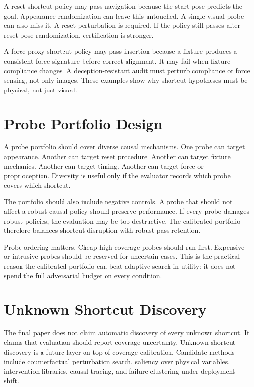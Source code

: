 \documentclass{article}
\begin{document}
A reset shortcut policy may pass navigation because the start pose predicts the goal. Appearance randomization can leave this untouched. A single visual probe can also miss it. A reset perturbation is required. If the policy still passes after reset pose randomization, certification is stronger.

A force-proxy shortcut policy may pass insertion because a fixture produces a consistent force signature before correct alignment. It may fail when fixture compliance changes. A deception-resistant audit must perturb compliance or force sensing, not only images. These examples show why shortcut hypotheses must be physical, not just visual.

\clearpage
\section{Probe Portfolio Design}

A probe portfolio should cover diverse causal mechanisms. One probe can target appearance. Another can target reset procedure. Another can target fixture mechanics. Another can target timing. Another can target force or proprioception. Diversity is useful only if the evaluator records which probe covers which shortcut.

The portfolio should also include negative controls. A probe that should not affect a robust causal policy should preserve performance. If every probe damages robust policies, the evaluation may be too destructive. The calibrated portfolio therefore balances shortcut disruption with robust pass retention.

Probe ordering matters. Cheap high-coverage probes should run first. Expensive or intrusive probes should be reserved for uncertain cases. This is the practical reason the calibrated portfolio can beat adaptive search in utility: it does not spend the full adversarial budget on every condition.

\clearpage
\section{Unknown Shortcut Discovery}

The final paper does not claim automatic discovery of every unknown shortcut. It claims that evaluation should report coverage uncertainty. Unknown shortcut discovery is a future layer on top of coverage calibration. Candidate methods include counterfactual perturbation search, saliency over physical variables, intervention libraries, causal tracing, and failure clustering under deployment shift.
\end{document}
